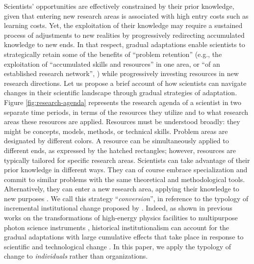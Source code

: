 \documentclass{article}
\begin{document}
Scientists' opportunities are effectively constrained by their prior knowledge, given that entering new research areas is associated with high entry costs such as learning costs. Yet, the exploitation of their knowledge may require a sustained process of adjustments to new realities by progressively redirecting accumulated knowledge to new ends. In that respect, gradual adaptations enable scientists to strategically retain some of  the benefits of ``problem retention'' (e.g., the exploitation of ``accumulated skills and resources'' in one area, or ``of an established research network'', \citealt[p.~106]{Gieryn1978}) while progressively investing resources in new research directions. Let us propose a brief account of how scientists can navigate changes in their scientific landscape through gradual strategies of adaptation. Figure \ref{fig:research-agenda} %
represents the research agenda of a scientist in two separate time periods, in terms of the resources they utilize and to what research areas these resources are applied. Resources must be understood broadly: they might be concepts, models, methods, or technical skills. Problem areas are designated by different colors. A resource can be simultaneously applied to different ends, as expressed by the hatched rectangles; however, resources are typically tailored for specific research areas. Scientists can take advantage of their prior knowledge in different ways. They can of course embrace specialization and commit to similar problems with the same theoretical and methodological tools.  
Alternatively, they can enter a new research area, applying their knowledge to new purposes \citep{Mulkay1974,schon1963displacement}. We call this strategy ``\textit{conversion}'', in reference to the typology of incremental institutional change proposed by \citet{mahoney_thelen_2009}. Indeed, as shown in previous works on the transformations of high-energy physics facilities to multipurpose photon science instruments \citep{Hallonsten2013,Heinze2017a}, historical institutionalism can account for the gradual adaptations with large cumulative effects that take place in response to scientific and technological change \citep{Heinze2012}. In this paper, we apply the typology of change to \textit{individuals} rather than organizations. 
\end{document}
